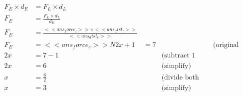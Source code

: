 \noindent{(\theminipagecount)}\quad

\begin{minipage}{0.5\textwidth}
    \begin{align*}
        F_E \times d_E &= F_L \times d_L \\
        F_E &= \frac{F_L \times d_L}{d_E} \\
        F_E &= \frac{<<ans_force_l>> \times <<ans_dist_l>>}{<<ans_dist_e>>} \\
        F_E &= <<ans_force_e>>N

        2x + 1 &= 7 & \quad &\text{(original equation)} \\
        2x &= 7 - 1 & \quad &\text{(subtract 1 from both sides)} \\
        2x &= 6 & \quad &\text{(simplify)} \\
        x &= \frac{6}{2} & \quad &\text{(divide both sides by 2)} \\
        x &= 3 & \quad &\text{(simplify)}
        
    \end{align*}
\end{minipage}
